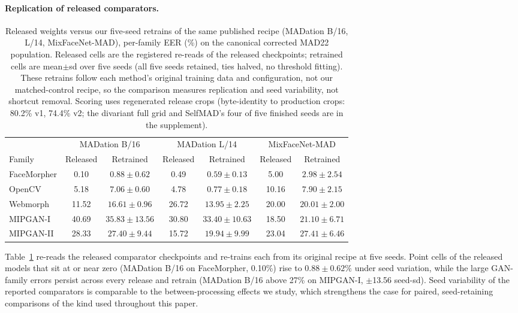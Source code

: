     \paragraph{Replication of released comparators.}
    \begin{table}[t]
    \centering\small
    \setlength{\tabcolsep}{5pt}
    \caption{Released weights versus our five-seed retrains of the same published recipe (MADation B/16, L/14, MixFaceNet-MAD), per-family EER (\%) on the canonical corrected MAD22 population. Released cells are the registered re-reads of the released checkpoints; retrained cells are mean$\pm$sd over five seeds (all five seeds retained, ties halved, no threshold fitting). These retrains follow each method's original training data and configuration, not our matched-control recipe, so the comparison measures replication and seed variability, not shortcut removal. Scoring uses regenerated release crops (byte-identity to production crops: 80.2\% v1, 74.4\% v2; the divariant full grid and SelfMAD's four of five finished seeds are in the supplement).}
    \label{tab:retrain_replication}
    \footnotesize
    \begin{tabular}{@{}lcc@{\hskip 12pt}cc@{\hskip 12pt}cc@{}}
    \toprule
     & \multicolumn{2}{c}{MADation B/16} & \multicolumn{2}{c}{MADation L/14} & \multicolumn{2}{c}{MixFaceNet-MAD} \\
    \cmidrule(lr){2-3}\cmidrule(lr){4-5}\cmidrule(lr){6-7}
    Family & Released & Retrained & Released & Retrained & Released & Retrained \\
    \midrule
    FaceMorpher & 0.10 & $0.88\pm0.62$ & 0.49 & $0.59\pm0.13$ & 5.00 & $2.98\pm2.54$ \\
    OpenCV & 5.18 & $7.06\pm0.60$ & 4.78 & $0.77\pm0.18$ & 10.16 & $7.90\pm2.15$ \\
    Webmorph & 11.52 & $16.61\pm0.96$ & 26.72 & $13.95\pm2.25$ & 20.00 & $20.01\pm2.00$ \\
    MIPGAN-I & 40.69 & $35.83\pm13.56$ & 30.80 & $33.40\pm10.63$ & 18.50 & $21.10\pm6.71$ \\
    MIPGAN-II & 28.33 & $27.40\pm9.44$ & 15.72 & $19.94\pm9.99$ & 23.04 & $27.41\pm6.46$ \\
    \bottomrule
    \end{tabular}
    \end{table}
    
    Table~\ref{tab:retrain_replication} re-reads the released comparator checkpoints and re-trains each from its original recipe at five seeds. Point cells of the released models that sit at or near zero (MADation B/16 on FaceMorpher, 0.10\%) rise to $0.88\pm0.62\%$ under seed variation, while the large GAN-family errors persist across every release and retrain (MADation B/16 above 27\% on MIPGAN-I, $\pm$13.56 seed-sd). Seed variability of the reported comparators is comparable to the between-processing effects we study, which strengthens the case for paired, seed-retaining comparisons of the kind used throughout this paper.
    
